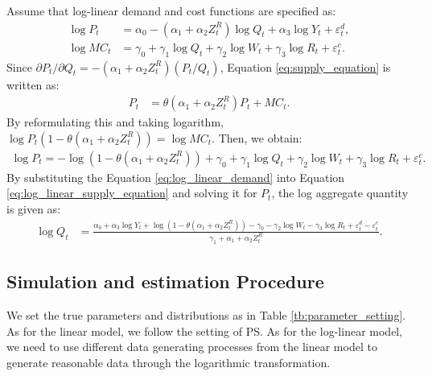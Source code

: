\documentclass[11pt, a4paper]{article}
\begin{document}
Assume that log-linear demand and cost functions are specified as:
\begin{align}
    \log P_{t} &= \alpha_0 - (\alpha_1 + \alpha_2 Z^{R}_{t}) \log Q_t + \alpha_3 \log Y_t + \varepsilon^{d}_{t},\label{eq:log_linear_demand}\\
    \log MC_t &= \gamma_0 + \gamma_1 \log Q_t +  \gamma_2 \log W_{t} + \gamma_3 \log R_t + \varepsilon^{c}_{t}.\label{eq:log_linear_marginal_cost}
\end{align}
Since $\partial P_t/\partial Q_t = - (\alpha_1 + \alpha_2 Z_{t}^R) (P_t/Q_t) $, Equation \eqref{eq:supply_equation} is written as:
\begin{align*}
    P_t &= \theta (\alpha_1 + \alpha_2 Z^{R}_{t}) P_t + MC_t.
\end{align*}
By reformulating this and taking logarithm, $\log P_t(1 -\theta (\alpha_1 + \alpha_2 Z^{R}_{t})) = \log MC_t.$
Then, we obtain:
\begin{align}
    \log P_t = - \log(1 - \theta(\alpha_1 + \alpha_2 Z^{R}_{t})) + \gamma_0 + \gamma_1 \log Q_t +  \gamma_2 \log W_{t} + \gamma_3 \log R_t + \varepsilon^{c}_{t}. \label{eq:log_linear_supply_equation}
\end{align}
By substituting the Equation \eqref{eq:log_linear_demand} into Equation \eqref{eq:log_linear_supply_equation} and solving it for $P_{t}$, the log aggregate quantity is given as: 
\begin{align*}
    \log Q_t &= \frac{ \alpha_0 + \alpha_3 \log Y_t + \log (1 - \theta (\alpha_1 + \alpha_2 Z^{R}_{t})) - \gamma_0  -  \gamma_2 \log W_{t} - \gamma_3 \log R_t + \varepsilon^{d}_{t} - \varepsilon^{c}_{t}}{\gamma_1+ \alpha_1 + \alpha_2 Z^{R}_{t} }.
\end{align*}


\subsection{Simulation and estimation Procedure}

We set the true parameters and distributions as in Table \ref{tb:parameter_setting}. 
As for the linear model, we follow the setting of PS.
As for the log-linear model, we need to use different data generating processes from the linear model to generate reasonable data through the logarithmic transformation. 
\end{document}
